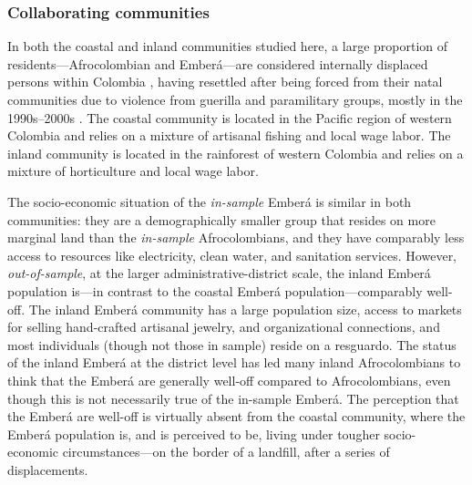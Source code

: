 \documentclass[bibauthoryear]{aa}
\begin{document}
\subsubsection{Collaborating communities}\label{pops}
In both the coastal and inland communities studied here, a large proportion of residents---Afrocolombian and Ember\'a---are considered internally displaced persons within Colombia \citep{oyola2015religion, escobar2003displacement}, having resettled after being forced from their natal communities due to violence from guerilla and paramilitary groups, mostly in the 1990s--2000s \citep{ibanez2009forced}. The coastal community is located in the Pacific region of western Colombia and relies on a mixture of artisanal fishing and local wage labor.  The inland community is located in the rainforest of western Colombia and relies on a mixture of horticulture and local wage labor.

The socio-economic situation of the \emph{in-sample} Ember\'a is similar in both communities: they are a demographically smaller group that resides on more marginal land than the \emph{in-sample} Afrocolombians, and they have comparably less access to resources like electricity, clean water, and sanitation services.  However,  \emph{out-of-sample}, at the larger administrative-district scale, the inland Ember\'a population is---in contrast to the coastal Ember\'a population---comparably well-off.  The inland Ember\'a community has a large population size, access to markets for selling hand-crafted artisanal jewelry,  and organizational connections, and most individuals (though not those in sample) reside on a resguardo.  The status of the inland Ember\'a at the district level has led many inland Afrocolombians to think that the Ember\'a are generally well-off compared to Afrocolombians, even though this is not necessarily true of the in-sample Ember\'a. The perception that the Ember\'a are well-off is virtually absent from the coastal community, where the Ember\'a population is, and is  perceived to be, living under tougher  socio-economic circumstances---on the border of a landfill, after a series of displacements.
\end{document}
